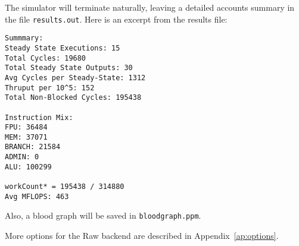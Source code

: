 %
The simulator will terminate naturally, leaving a detailed accounts
summary in the file {\tt results.out}.  Here is an excerpt from the
results file: {\small
\begin{verbatim}
Summmary:
Steady State Executions: 15
Total Cycles: 19680
Total Steady State Outputs: 30
Avg Cycles per Steady-State: 1312
Thruput per 10^5: 152
Total Non-Blocked Cycles: 195438

Instruction Mix:
FPU: 36484
MEM: 37071
BRANCH: 21584
ADMIN: 0
ALU: 100299

workCount* = 195438 / 314880
Avg MFLOPS: 463
\end{verbatim}
}
\noindent Also, a blood graph will be saved in {\tt bloodgraph.ppm}.

\smallskip \noindent More options for the Raw backend are described in
Appendix~\ref{ap:options}.

\clearpage
